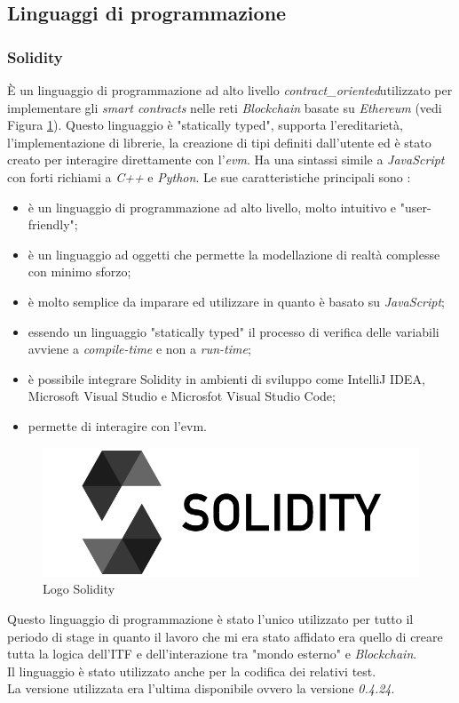 \subsection{Linguaggi di programmazione}
\subsubsection{Solidity}
È un linguaggio di programmazione ad alto livello \emph{\gls{contract_oriented}}\glsfirstoccur  utilizzato per implementare gli \textit{smart contracts} nelle reti \textit{Blockchain} basate su \textit{Ethereum} (vedi Figura \ref{img:solidity}).
Questo linguaggio è "statically typed", supporta l'ereditarietà, l'implementazione di librerie, la creazione di tipi definiti dall'utente ed è stato creato per interagire direttamente con l'\emph{\gls{evm}}\glsfirstoccur. 
Ha una sintassi simile a \textit{JavaScript} con forti richiami a \textit{C++} e \textit{Python}\cite{solidity}.
Le sue caratteristiche principali sono \cite{solidity}:
\begin{itemize}
	\item è un linguaggio di programmazione ad alto livello, molto intuitivo e "user-friendly";
	\item è un linguaggio ad oggetti che permette la modellazione di realtà complesse con minimo sforzo;
	\item è molto semplice da imparare ed utilizzare in quanto è basato su \textit{JavaScript};
	\item essendo un linguaggio "statically typed" il processo di verifica delle variabili avviene a \textit{compile-time} e non a \textit{run-time};
	\item è possibile integrare Solidity in ambienti di sviluppo come IntelliJ IDEA, Microsoft Visual Studio e Microsfot Visual Studio Code;
	\item permette di interagire con l'\gls{evm}.
\end{itemize}
\begin{figure}[h]
	\centering
	\includegraphics[scale=0.25]{immagini/solidity}
	\caption{Logo Solidity}
	\label{img:solidity}
\end{figure}
Questo linguaggio di programmazione è stato l'unico utilizzato per tutto il periodo di stage in quanto il lavoro che mi era stato affidato era quello di creare tutta la logica dell'\gls{ITF} e dell'interazione tra "mondo esterno" e \textit{Blockchain}.\\
Il linguaggio è stato utilizzato anche per la codifica dei relativi test.\\
La versione utilizzata era l'ultima disponibile ovvero la versione \textit{0.4.24}.
